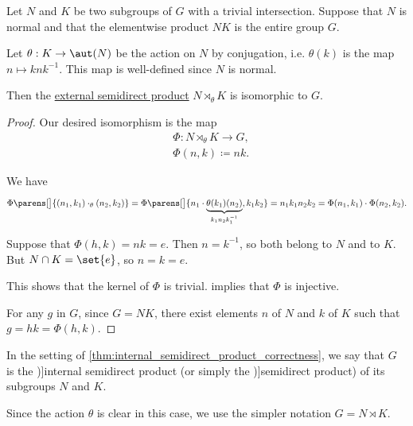\begin{proposition}\label{thm:internal_semidirect_product_correctness}
  Let \( N \) and \( K \) be two subgroups of \( G \) with a trivial intersection. Suppose that \( N \) is normal and that the elementwise product \( NK \) is the entire group \( G \).

  Let \( \theta: K \to \aut(N) \) be the action on \( N \) by conjugation, i.e. \( \theta(k) \) is the map \( n \mapsto k n k^{-1} \). This map is well-defined since \( N \) is normal.

  Then the \hyperref[def:group_external_semidirect_product]{external semidirect product} \( N \rtimes_\theta K \) is isomorphic to \( G \).
\end{proposition}
\begin{proof}
  Our desired isomorphism is the map
  \begin{equation*}
    \begin{aligned}
      &\Phi: N \rtimes_\theta K \to G, \\
      &\Phi(n, k) \coloneqq nk.
    \end{aligned}
  \end{equation*}

   We have
  \begin{equation*}
    \Phi\parens[\big]{ (n_1, k_1) \cdot_\theta (n_2, k_2) }
    =
    \Phi\parens[\big]{ n_1 \cdot \underbrace{\theta(k_1)(n_2)}_{k_1 n_2 k_1^{-1}}, k_1 k_2 }
    =
    n_1 k_1 n_2 k_2
    =
    \Phi(n_1, k_1) \cdot \Phi(n_2, k_2).
  \end{equation*}

   Suppose that \( \Phi(h, k) = n k = e \). Then \( n = k^{-1} \), so both belong to \( N \) and to \( K \). But \( N \cap K = \set{ e } \), so \( n = k = e \).

  This shows that the kernel of \( \Phi \) is trivial.  implies that \( \Phi \) is injective.

   For any \( g \) in \( G \), since \( G = NK \), there exist elements \( n \) of \( N \) and \( k \) of \( K \) such that \( g = hk = \Phi(h, k) \).
\end{proof}

\begin{definition}\label{def:internal_semidirect_product}
  In the setting of \cref{thm:internal_semidirect_product_correctness}, we say that \( G \) is the \term[en=internal semidirect product (\cite[170]{Knapp2016BasicAlgebra})]{internal semidirect product} (or simply the \term[ru=полупрямое произведение (\cite[def. 10.1.4]{Винберг2014КурсАлгебры})]{semidirect product}) of its subgroups \( N \) and \( K \).

  Since the action \( \theta \) is clear in this case, we use the simpler notation \( G = N \rtimes K \).
\end{definition}

